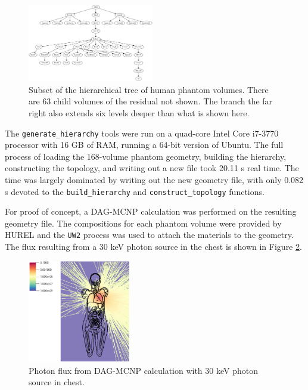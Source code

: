 \documentclass{anstrans}
\begin{document}
\begin{figure}[ht]
 \centering
 \includegraphics[width=0.49\textwidth]{../figs/trimtree.png}
 \caption{Subset of the hierarchical tree of human phantom volumes.  
          There are 63 child volumes of the residual not shown. 
          The branch the far right also extends
          six levels deeper than what is shown here.}
 \label{fig:trimtree}
\end{figure}

The \texttt{generate\_hierarchy} tools were run on a quad-core Intel Core i7-3770 processor
with 16 GB of RAM, running a 64-bit version of Ubuntu.  The full process of loading the 168-volume phantom
geometry, building the hierarchy, constructing the topology, and writing out a new file took
20.11 s real time.  The time was largely dominated by writing out the new geometry file, with
only 0.082 s devoted to the \texttt{build\_hierarchy} and \texttt{construct\_topology} functions. 



For proof of concept, a DAG-MCNP calculation was performed on the resulting geometry file.
The compositions for each phantom volume were provided by HUREL and the \texttt{UW2} 
process was used to attach the materials to the geometry.  The flux resulting from 
a 30 keV photon source in the chest is shown in Figure \ref{fig:mcnp}. 

\begin{figure}[ht] %
  \centering
  \includegraphics[width=0.4\textwidth]{../figs/30KeV_Psource.png}
  \caption{Photon flux from DAG-MCNP calculation with 30 keV photon source in chest. }
  \label{fig:mcnp}
\end{figure}
\end{document}
